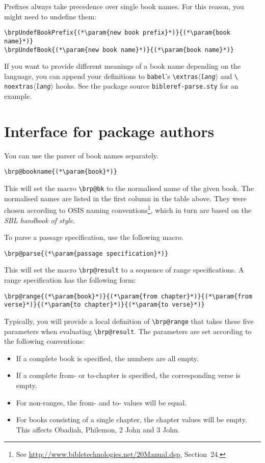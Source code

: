 \documentclass[DIV12,BCOR0mm]{scrartcl}
\newcommand{\param}[1]{$\langle${\normalfont\itshape #1\/}$\rangle$}
\begin{document}
Prefixes always take precedence over single book names. For this reason, you
might need to undefine them:
\begin{lstlisting}
\brpUndefBookPrefix{(*\param{new book prefix}*)}{(*\param{book name}*)}
\brpUndefBook{(*\param{new book name}*)}{(*\param{book name}*)}
\end{lstlisting}

If you want to provide different meanings of a book name depending on the
language, you can append your definitions to \texttt{babel}'s
\texttt{\textbackslash extras\param{lang}} and \texttt{\textbackslash
  noextras\param{lang}} hooks. See the package source
\texttt{bibleref-parse.sty} for an example.

\section{Interface for package authors}

You can use the parser of book names separately.
\begin{lstlisting}
\brp@bookname{(*\param{book}*)}
\end{lstlisting}
This will set the macro \lstinline|\brp@bk| to the normalised name of the given
book. The normalised names are listed in the first column in the table above.
They were chosen according to OSIS naming conventions\footnote{See
  \url{http://www.bibletechnologies.net/20Manual.dsp}, Section~24.}, which in
turn are based on the \emph{SBL handbook of style}.

To parse a passage specification, use the following macro.
\begin{lstlisting}
\brp@parse{(*\param{passage specification}*)}
\end{lstlisting}
This will set the macro \lstinline|\brp@result| to a sequence of range
specifications. A range specification has the following form:
\begin{lstlisting}
\brp@range{(*\param{book}*)}{(*\param{from chapter}*)}{(*\param{from verse}*)}{(*\param{to chapter}*)}{(*\param{to verse}*)}
\end{lstlisting}
Typically, you will provide a local definition of \lstinline|\brp@range| that
takes these five parameters when evaluating \lstinline|\brp@result|. The
parameters are set according to the following conventions:
\begin{itemize}
 \item If a complete book is specified, the numbers are all empty.
 \item If a complete from- or to-chapter is specified, the corresponding verse
  is empty.
 \item For non-ranges, the from- and to- values will be equal.
 \item For books consisting of a single chapter, the chapter values will be
  empty. This affects Obadiah, Philemon, 2 John and 3 John.
\end{itemize}
\end{document}
